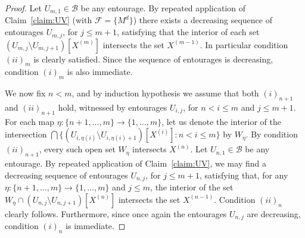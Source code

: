 \documentclass[10pt,a4paper]{amsart}
\newcommand{\BU}{\Bb} %
\newcommand{\Bb}{\mathcal{B}}
\newcommand{\Ff}{\mathcal{F}}
\newcommand{\X}[1]{X^{(#1)}}
\begin{document}
\begin{proof}
Let $U_{m,1}\in \BU$ be any entourage. By repeated application of Claim~\ref{claim:UV} (with $\Ff=\{M^d\}$) there exists a decreasing sequence of entourages $U_{m,j}$, for $j\leq m+1$, satisfying that the interior of each set $(U_{m,j} \setminus U_{m,j+1})[\X{m}]$ intersects the set $\X{m-1}$. In particular condition $(ii)_m$ is clearly satisfied. Since the sequence of entourages is decreasing, condition $(i)_m$ is also immediate. 

We now fix $n<m$, and by induction hypothesis we assume that both $(i)_{n+1}$ and $(ii)_{n+1}$ hold, witnessed by entourages $U_{i,j}$, for $n<i\leq m$ and $j\leq m+1$. For each map $\eta:\{n+1,\ldots, m\}\rightarrow \{1,\ldots, m\}$, let us denote the interior of the intersection $\bigcap \{(U_{i,\eta(i)} \setminus U_{i,\eta(i)+1})[\X{i}] : n< i\leq m \}$ by $W_\eta$. By condition $(ii)_{n+1}$, every such open set $W_\eta$ intersects $\X{n}$. Let $U_{n,1}\in \BU$ be any entourage. By repeated application of Claim~\ref{claim:UV}, we may find a decreasing sequence of entourages $U_{n,j}$, for $j\leq m+1$, satisfying that, for any $\eta:\{n+1,\ldots, m\}\rightarrow \{1,\ldots, m\}$ and $j\leq m$, the interior of the set $W_\eta \cap (U_{n,j} \setminus U_{n,j+1})[\X{n}]$ intersects the set $\X{n-1}$. Condition $(ii)_n$ clearly follows. Furthermore, since once again the entourages $U_{n,j}$ are decreasing, condition $(i)_n$ is immediate. 
\end{proof}
\end{document}

